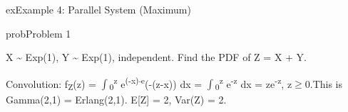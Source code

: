 \begin{PSbox}[unbreakable]{ex}{Example 4: Parallel System (Maximum)}


\begin{Shaded}
\begin{Highlighting}[]
 \OperatorTok{=} \OperatorTok{;}  \OperatorTok{=} \OperatorTok{;}
 \OperatorTok{=} \NormalTok{(}\OperatorTok{/}\OperatorTok{,} \OperatorTok{,} \NormalTok{)}\OperatorTok{;}
 \OperatorTok{=} \NormalTok{(}\OperatorTok{/}\OperatorTok{,} \OperatorTok{,} \NormalTok{)}\OperatorTok{;}
 \OperatorTok{=} \NormalTok{(}\OperatorTok{,} \NormalTok{)}\OperatorTok{;}

\NormalTok{(}\OperatorTok{,} \OperatorTok{/}\NormalTok{)}\OperatorTok{;}
\NormalTok{(}\OperatorTok{,} \OperatorTok{/}\NormalTok{(}\OperatorTok{*}\NormalTok{))}\OperatorTok{;}
\NormalTok{(}\OperatorTok{,} \NormalTok{(}\NormalTok{))}\OperatorTok{;}
\end{Highlighting}
\end{Shaded}

\end{PSbox}


\begin{PSbox}[unbreakable]{prob}{Problem 1}

X \textasciitilde{} Exp(1), Y \textasciitilde{} Exp(1), independent. Find the PDF of Z = X + Y.

\PSsolution{} Convolution: f\textsubscript{Z}(z) = \ensuremath{\int}\textsubscript{0}\textsuperscript{z} e\textsuperscript{(-x)\ensuremath{\cdot}e}(-(z-x)) dx = \ensuremath{\int}\textsubscript{0}\textsuperscript{z} e\textsuperscript{-z} dx = ze\textsuperscript{-z}, z\ensuremath{\ge}0.\PSbr{}This is Gamma(2,1) = Erlang(2,1). E[Z] = 2, Var(Z) = 2.

\end{PSbox}

